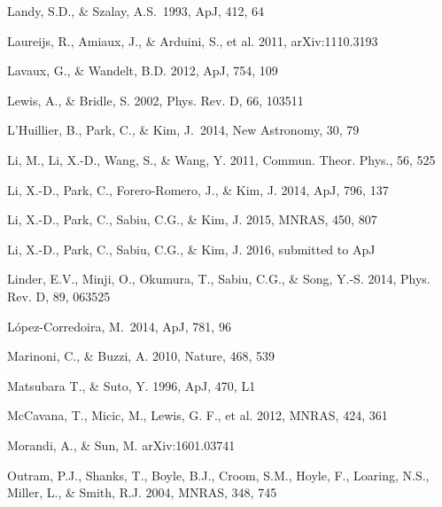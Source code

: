 \documentclass[iop]{emulateapj}
\begin{document}
\begin{thebibliography}{}
Landy, S.D., \& Szalay, A.S.\ 1993, ApJ, 412, 64 

Laureijs, R., Amiaux, J., \& Arduini, S., et al. 2011, arXiv:1110.3193

Lavaux, G., \& Wandelt, B.D. 2012, ApJ, 754, 109  


Lewis, A., \& Bridle, S. 2002, Phys. Rev. D, 66, 103511

L'Huillier, B., Park, C., \& Kim, J.\ 2014, New Astronomy, 30, 79 

Li, M., Li, X.-D., Wang, S., \& Wang, Y. 2011, Commun. Theor. Phys., 56, 525

Li, X.-D., Park, C., Forero-Romero, J., \& Kim, J. 2014, ApJ, 796, 137

Li, X.-D., Park, C., Sabiu, C.G., \& Kim, J. 2015, MNRAS, 450, 807 

Li, X.-D., Park, C., Sabiu, C.G., \& Kim, J. 2016, submitted to ApJ



Linder, E.V., Minji, O., Okumura, T., Sabiu, C.G., \& Song, Y.-S. 2014, Phys. Rev. D, 89, 063525  

L{\'o}pez-Corredoira, M.\ 2014, ApJ, 781, 96 

Marinoni, C., \& Buzzi, A. 2010, Nature, 468, 539  

Matsubara T., \& Suto, Y. 1996, ApJ, 470, L1  

McCavana, T., Micic, M., Lewis, G. F., et al. 2012, MNRAS, 424, 361


Morandi, A., \& Sun, M. arXiv:1601.03741


Outram, P.J., Shanks, T., Boyle, B.J., Croom, S.M., Hoyle, F., Loaring, N.S., 
Miller, L., \& Smith, R.J. 2004, MNRAS, 348, 745  


\end{thebibliography}
\end{document}
